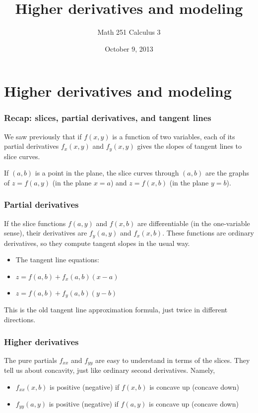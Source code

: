 \documentclass[11pt,ignorenonframetext,]{beamer}
\title{Higher derivatives and modeling}
\author{Math 251 Calculus 3}
\date{October 9, 2013}
\begin{document}
\frame{\titlepage}

\section{Higher derivatives and modeling}

\begin{frame}\frametitle{Recap: slices, partial derivatives, and tangent
lines}

We saw previously that if $f(x,y)$ is a function of two variables, each
of its partial derivatives $f_x(x,y)$ and $f_y(x,y)$ gives the slopes of
tangent lines to slice curves.

If $(a, b)$ is a point in the plane, the slice curves through $(a,b)$
are the graphs of $z = f(a, y)$ (in the plane $x = a$) and $z = f(x, b)$
(in the plane $y = b$).

\end{frame}

\begin{frame}\frametitle{Partial derivatives}

If the slice functions $f(a, y)$ and $f(x,b)$ are differentiable (in the
one-variable sense), their derivatives are $f_y(a,y)$ and $f_x(x,b)$.
These functions are ordinary derivatives, so they compute tangent slopes
in the usual way.

\begin{itemize}[<+->]
\itemsep1pt\parskip0pt
\item
  The tangent line equations:
\item
  $z = f(a, b) + f_x(a,b)(x - a)$
\item
  $z = f(a, b) + f_y(a,b)(y - b)$
\end{itemize}

This is the old tangent line approximation formula, just twice in
different directions.

\end{frame}

\begin{frame}\frametitle{Higher derivatives}

The pure partials $f_{xx}$ and $f_{yy}$ are easy to understand in terms
of the slices. They tell us about concavity, just like ordinary second
derivatives. Namely,

\begin{itemize}
\itemsep1pt\parskip0pt
\item
  $f_{xx}(x,b)$ is positive (negative) if $f(x,b)$ is concave up
  (concave down)
\item
  $f_{yy}(a,y)$ is positive (negative) if $f(a,y)$ is concave up
  (concave down)
\end{itemize}

\end{frame}
\end{document}
